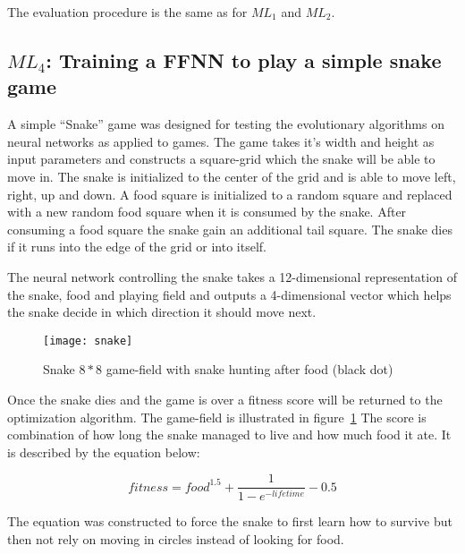 The evaluation procedure is the same as for $ML_{1}$ and $ML_{2}$.

\subsection{$ML_{4}$: Training a FFNN to play a simple snake game}

A simple ``Snake'' game was designed for testing the evolutionary algorithms on neural networks as applied to games. The game takes it's width and height as input parameters and constructs a square-grid which the snake will be able to move in. The snake is initialized to the center of the grid and is able to move left, right, up and down. A food square is initialized to a random square and replaced with a new random food square when it is consumed by the snake. After consuming a food square the snake gain an additional tail square. The snake dies if it runs into the edge of the grid or into itself.

The neural network controlling the snake takes a 12-dimensional representation of the snake, food and playing field and outputs a 4-dimensional vector which helps the snake decide in which direction it should move next.

\begin{figure}[H]
  \centering
  \texttt{[image: snake]}
  \caption{Snake $8*8$ game-field with snake hunting after food (black dot)}
  \label{snake}
\end{figure}

Once the snake dies and the game is over a fitness score will be returned to the optimization algorithm. The game-field is illustrated in figure~\ref{snake} The score is combination of how long the snake managed to live and how much food it ate. It is described by the equation below:

\begin{equation}
  fitness = food^{1.5} +  \frac{1}{1-e^{-lifetime}}  - 0.5
\end{equation}

The equation was constructed to force the snake to first learn how to survive but then not rely on moving in circles instead of looking for food.
